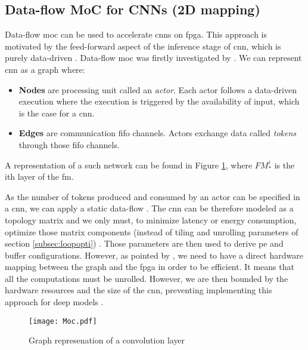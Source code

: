 \subsection{Data-flow MoC for CNNs (2D mapping)}
%
%
Data-flow \acrfull{moc} can be used to accelerate \acrshort{cnn}s on \acrshort{fpga}. This approach is motivated by the feed-forward aspect of the inference stage of \acrshort{cnn}, which is purely data-driven \cite{abdelouahab_accelerating_2018}. Data-flow \acrfull{moc} was firstly investigated by \cite{lin_li_low_2016}.  We can represent \acrshort{cnn} as a graph where:
\begin{itemize}
    \item \textbf{Nodes} are processing unit called an \textit{actor}. Each actor follows a data-driven execution where the execution is triggered by the availability of input, which is the case for a \acrshort{cnn}.
    \item \textbf{Edges} are communication \acrshort{fifo} channels. Actors exchange data called \textit{tokens} through those \acrshort{fifo} channels.
\end{itemize}
A representation of a such network can be found in Figure \ref{fig:moc}, where $FM_{*}^{i}$ is the ith layer of the \acrshort{fm}.

As the number of tokens produced and consumed by an actor can be specified in a \acrshort{cnn}, we can apply a static data-flow \cite{lee_static_1987}. The \acrshort{cnn} can be therefore modeled as a topology matrix and we only must, to minimize latency or energy consumption, optimize those matrix components (instead of tiling and unrolling parameters of section \ref{subsec:loopopti}) \cite{venieris_latency-driven_2017}. Those parameters are then used to derive \acrshort{pe} and buffer configurations. However, as pointed by \textcite{abdelouahab_tactics_2017}, we need to have a direct hardware mapping between the graph and the \acrshort{fpga} in order to be efficient. It means that all the computations must be unrolled. However, we are then bounded by the hardware resources and the size of the \acrshort{cnn}, preventing implementing this approach for deep models \cite{abdelouahab_accelerating_2018}.
\begin{figure}
    \centering
    \texttt{[image: Moc.pdf]}
    \caption{Graph represenation of a convolution layer}
    \label{fig:moc}
\end{figure}
%
%
